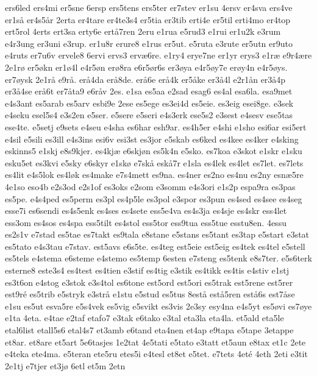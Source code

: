 {ers6led
ers4mi
er5sne
6ersp
ers5tens
ers5ter
er7stev
er1su
4ersv
er4sva
ers4ve
er1s^^e5
er4s5^^e5r
2erta
er4tare
er4te3s4
er5tia
er3tib
erti4e
er5til
erti4mo
er4top
ert5rol
4erts
ert3sa
erty6e
ert^^e57ren
2eru
e1rua
e5rud3
e1rui
er1u2k
e3rum
e4r3ung
er3uni
e3rup.
er1u8r
erure8
e1rus
er5ut.
e5ruta
e3rute
er5utn
er9uto
e4ruts
er7u6v
ervele8
6ervi
ervs3
erv^^e66re.
e1ry4
erye7ne
er1yr
erys3
e1r^^e6
e9r4^^e6re
2e1r^^f8
er5^^f8kn
er1^^f84l
e4r5^^f8n
er^^f88ra
e6r5^^f8r6s
er3^^f8ya
e4r5^^f8y7e
er^^f8y4n
e4r5^^f8ys.
er7^^f8ysk
2e1r^^e5
e9r^^e5.
er^^e54da
er^^e58de.
er^^e56e
er^^e54k
er5^^e5ke
er3^^e54l
e2r1^^e5n
er3^^e54p
er3^^e54se
er^^e56t
er7^^e5ta9
e6r^^e5v
2es.
e1sa
es5aa
e2sad
esag6
es4al
esa6la.
esa9met
e4s3ant
es5arab
es5arv
esbi9e
2ese
es5ege
es3ei4d
es5eie.
es3eig
esei8ge.
e3sek
e4seku
esel5s4
e3s2en
e5ser.
e5sere
e5seri
e4s3erk
ese5s2
e3sest
e4sesv
ese5tas
ese4te.
e5setj
e9sets
e4seu
e4sha
es6har
esh9ar.
es4h5er
e4shi
e1sho
esi6ar
esi5ert
e4sil
e5sili
es3ill
e4s3ins
esi6v
esi3st
es3jor
e5skab
es6ked
es4kee
es4ker
e4sking
eskinns5
e1skj
e8s9kjer.
es4kj^^e6
e6skj^^f8n
es5k4n
e5sko.
es7koa
e3skot
e1skr
e1sku
esku5et
es3kvi
e5sky
e6skyr
e1sk^^f8
e7sk^^e5
esk^^e57r
e1sla
es4lek
es4let
es7let.
es7lets
es4lit
e4s5lok
es4l^^f8k
es4make
e7s4mett
es9na.
es4ner
es2no
es4nu
es2ny
esn^^e65re
4e1so
eso4b
e2s3od
e2s1of
es3oks
e2som
e3somm
e4s3ori
e1s2p
espa9ra
es3pas
es5pe.
e4s4ped
es5perm
es3pl
es4p5le
es3pol
e3spor
es3pun
es4sed
es4see
es4seg
esse7i
es6sendi
es4s5enk
es4ses
es4sete
ess5e4va
es4s3ja
es4sje
es4skr
ess4let
ess3om
es4sos
es4spa
ess5tilt
es4stol
ess5tor
ess9tua
ess5tue
esstu8en.
4essu
es2s1v
e7stad
es5tae
es7takt
es9tala
e8stane
e5stans
es5tant
es3tap
e5start
e3stat
es5tato
e4s3tau
e7stav.
est5avs
e6s5te.
es4teg
est5eie
est5eig
es4tek
es4tel
e5stell
es5tels
e4stema
e6steme
e4stemo
es5temp
6esten
e7steng
es5tenk
e8s7ter.
e5s6terk
esterne8
este3s4
es4test
es4tien
e3stif
es4tig
e3stik
es4tikk
es4tis
e4stiv
e1stj
es3t6on
e4stog
e3stok
e3s4tol
es6tone
est5ord
est5ori
es5trak
est5rene
est5rer
est9r^^e9
es5trib
e5stryk
e3str^^e5
e1stu
e5stud
es5tus
8est^^e5
est^^e55ren
est^^e56s
est7^^e5se
e1su
es5ut
esva5re
e5s4vek
es5vig
e5svikt
es3vis
2e3sy
esy4na
e4s5yt
es5^^f8vi
es7^^f8ye
e1ta
4eta.
e4tae
e2taf
etafo7
e3tak
e6tako
e3tal
eta3la
eta4la.
et5ald
eta5le
etal6list
etall5s6
etal4s7
et3amb
e6tand
eta4nen
et4ap
e9tapa
e5tape
3etappe
et8ar.
et8are
et5art
5e6tasjes
1e2tat
4e5tati
e5tato
e3tatt
et5aun
e8tax
et1c
2ete
e4teka
ete4ma.
e5teran
ete5ru
etes5i
e4tesl
et8et
e5tet.
e7tets
4et^^e9
4eth
2eti
e3tit
2e1tj
e7tjer
et3j^^f8
6etl
et5m
2etn
}
